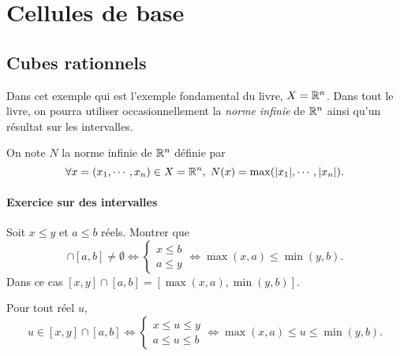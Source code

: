 \section{Cellules de base}\label{Sec:CellulesBases}

\subsection{Cubes rationnels}\label{SubSec:CubesRat}
Dans cet exemple qui est l'exemple fondamental du livre, $X=\mathbb{R}^n$. Dans tout le livre, on pourra utiliser occasionnellement la \emph{norme infinie} de $\mathbb{R}^n$ ainsi qu'un résultat sur les intervalles. 
\begin{defi}
 On note $N$ la norme infinie de $\mathbb{R}^n$ définie par
 \begin{displaymath}
  \forall x=(x_1,\cdots,x_n)\in X= \mathbb{R}^n, \; N(x)=\max(|x_1|,\cdots,|x_n|).
 \end{displaymath}
\end{defi}

 \paragraph{Exercice sur des intervalles} \label{ExoIntervalles}
 Soit $x\leq y$ et $a\leq b$ réels. Montrer que
 \begin{displaymath}
  [x,y] \cap [a,b] \neq \emptyset
  \Leftrightarrow
  \left\lbrace
  \begin{aligned}
    x \leq b \\
    a \leq y
  \end{aligned}
  \right.
  \Leftrightarrow \max(x,a)\leq \min(y,b).
 \end{displaymath}
 Dans ce cas $[x,y]\cap [a,b] = [\max(x,a),\min(y,b)]$.
\begin{demo}
Pour tout réel $u$,
\begin{displaymath}
 u \in [x,y] \cap [a,b]
 \Leftrightarrow
 \left\lbrace
 \begin{aligned}
   x \leq u \leq y \\
   a \leq u \leq b
 \end{aligned}
 \right.
 \Leftrightarrow
   \max(x,a) \leq u \leq \min(y,b) .
 \end{displaymath}
\end{demo}

